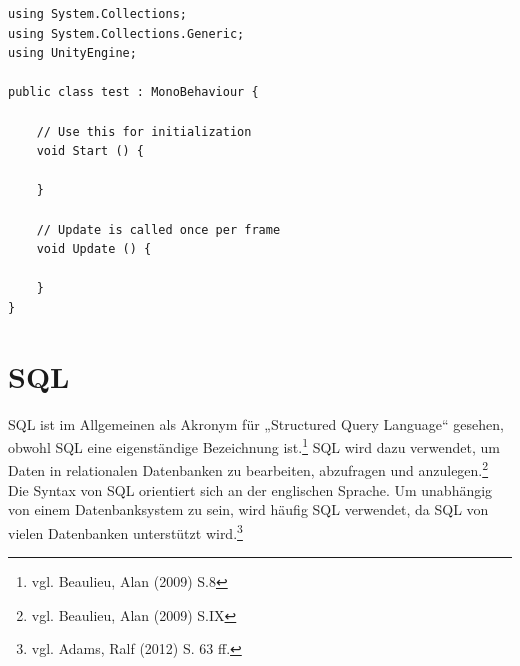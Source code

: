 \begin{scriptsize}
\lstset{
	float,
	caption=Aufbau eines Unity Skriptes, 
	language=[Sharp]C, 	
	frame=single,  
	showstringspaces=false, 
	showspaces=false, 
	numbers=left, 
	captionpos=b, 
	belowcaptionskip=4pt,
	basicstyle=\ttfamily
} 

\begin{lstlisting}[label=lst:unity3Dc]
using System.Collections;
using System.Collections.Generic;
using UnityEngine;

public class test : MonoBehaviour {

	// Use this for initialization
	void Start () {
		
	}
	
	// Update is called once per frame
	void Update () {
		
	}
}
\end{lstlisting}
\end{scriptsize}	

\section{SQL}

SQL ist im Allgemeinen als Akronym für „Structured Query Language“ gesehen, obwohl SQL eine eigenständige Bezeichnung ist.\footnote{vgl. Beaulieu, Alan\cite{sql1} (2009) S.8} SQL wird dazu verwendet, um Daten in relationalen Datenbanken zu bearbeiten, abzufragen und anzulegen.\footnote{vgl. Beaulieu, Alan\cite{sql1} (2009) S.IX} Die Syntax von SQL orientiert sich an der englischen Sprache. Um unabhängig von einem Datenbanksystem zu sein, wird häufig SQL verwendet, da SQL von vielen Datenbanken unterstützt wird.\footnote{vgl. Adams, Ralf\cite{sql2} (2012) S. 63 ff.}